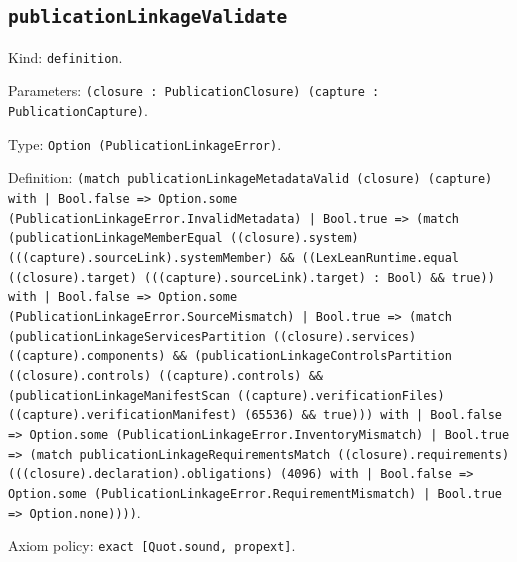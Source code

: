 \documentclass[11pt]{article}
\begin{document}
\subsection*{\texttt{publicationLinkageValidate}}
\noindent Kind: \texttt{definition}.\par
\noindent Parameters: \texttt{(closure : PublicationClosure) (capture : PublicationCapture)}.\par
\noindent Type: \texttt{Option (PublicationLinkageError)}.\par
\noindent Definition: \texttt{(match publicationLinkageMetadataValid (closure) (capture) with | Bool.false => Option.some (PublicationLinkageError.InvalidMetadata) | Bool.true => (match (publicationLinkageMemberEqual ((closure).system) (((capture).sourceLink).systemMember) \&\& ((LexLeanRuntime.equal ((closure).target) (((capture).sourceLink).target) : Bool) \&\& true)) with | Bool.false => Option.some (PublicationLinkageError.SourceMismatch) | Bool.true => (match (publicationLinkageServicesPartition ((closure).services) ((capture).components) \&\& (publicationLinkageControlsPartition ((closure).controls) ((capture).controls) \&\& (publicationLinkageManifestScan ((capture).verificationFiles) ((capture).verificationManifest) (65536) \&\& true))) with | Bool.false => Option.some (PublicationLinkageError.InventoryMismatch) | Bool.true => (match publicationLinkageRequirementsMatch ((closure).requirements) (((closure).declaration).obligations) (4096) with | Bool.false => Option.some (PublicationLinkageError.RequirementMismatch) | Bool.true => Option.none))))}.\par
\noindent Axiom policy: \texttt{exact [Quot.sound, propext]}.\par
\end{document}
